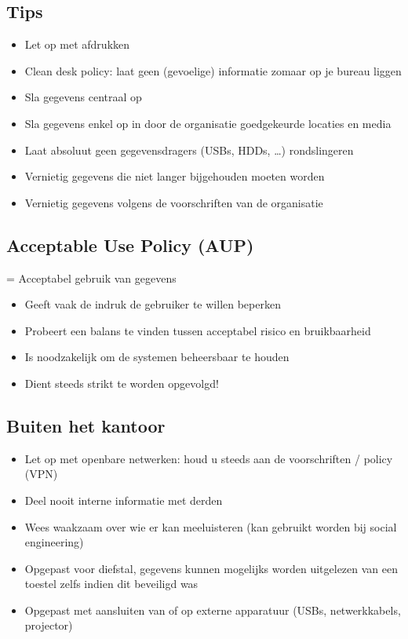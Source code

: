 \documentclass{article}
\begin{document}
\subsection{Tips}

\begin{itemize}
    \item Let op met afdrukken
    \item Clean desk policy: laat geen (gevoelige) informatie zomaar op je bureau liggen
    \item Sla gegevens centraal op
    \item Sla gegevens enkel op in door de organisatie goedgekeurde locaties en media
    \item Laat absoluut geen gegevensdragers (USBs, HDDs, \dots) rondslingeren
    \item Vernietig gegevens die niet langer bijgehouden moeten worden
    \item Vernietig gegevens volgens de voorschriften van de organisatie
\end{itemize}

\subsection{Acceptable Use Policy (AUP)}

= Acceptabel gebruik van gegevens

\begin{itemize}
    \item Geeft vaak de indruk de gebruiker te willen beperken
    \item Probeert een balans te vinden tussen acceptabel risico en bruikbaarheid
    \item Is noodzakelijk om de systemen beheersbaar te houden
    \item Dient steeds strikt te worden opgevolgd!
\end{itemize}

\subsection{Buiten het kantoor}

\begin{itemize}
    \item Let op met openbare netwerken: houd u steeds aan de voorschriften / policy (VPN)
    \item Deel nooit interne informatie met derden
    \item Wees waakzaam over wie er kan meeluisteren (kan gebruikt worden bij social engineering)
    \item Opgepast voor diefstal, gegevens kunnen mogelijks worden uitgelezen van een toestel zelfs indien dit beveiligd was
    \item Opgepast met aansluiten van of op externe apparatuur (USBs, netwerkkabels, projector)
\end{itemize}
\end{document}
